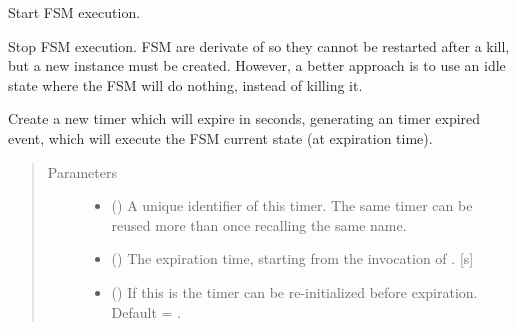 \documentclass[letterpaper,10pt,english]{sphinxmanual}
\begin{document}

\begin{fulllineitems}
\label{\detokenize{fsm:start}}
Start FSM execution.

\end{fulllineitems}


\begin{fulllineitems}
\label{\detokenize{fsm:kill}}
Stop FSM execution. FSM are derivate of  so they
cannot be restarted after a kill, but a new instance must be created.
However, a better approach is to use an idle state where the FSM will do
nothing, instead of killing it.

\end{fulllineitems}


\begin{fulllineitems}
\label{\detokenize{fsm:tmrSet}}
Create a new timer which will expire in  seconds, generating an
timer expired event, which will execute the FSM current state (at expiration
time).
\begin{quote}\begin{description}
\item[{Parameters}] \leavevmode\begin{itemize}
\item {} 
 () \textendash{} A unique identifier of this timer. The same timer can be reused more than once recalling the same name.

\item {} 
 () \textendash{} The expiration time, starting from the invocation of {\hyperref[\detokenize{fsm:tmrSet}]{}}. {[}s{]}

\item {} 
 () \textendash{} If this is  the timer can be re-initialized before expiration. Default = .

\end{itemize}

\end{description}\end{quote}

\end{fulllineitems}
\end{document}
